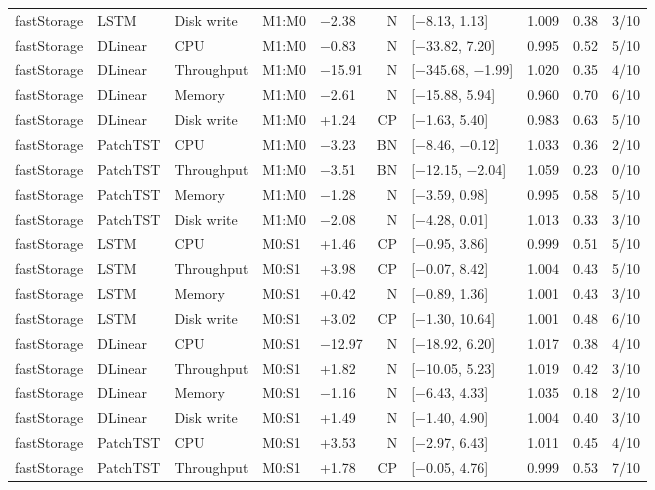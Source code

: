 \documentclass[a4paper,11pt]{article}
\begin{document}
\begin{longtable}{@{}lllllrlrrr@{}}
fastStorage & LSTM & Disk write & M1:M0 & $-$2.38 & N & [$-$8.13, 1.13] & 1.009 & 0.38 & 3/10 \\
fastStorage & DLinear & CPU & M1:M0 & $-$0.83 & N & [$-$33.82, 7.20] & 0.995 & 0.52 & 5/10 \\
fastStorage & DLinear & Throughput & M1:M0 & $-$15.91 & N & [$-$345.68, $-$1.99] & 1.020 & 0.35 & 4/10 \\
fastStorage & DLinear & Memory & M1:M0 & $-$2.61 & N & [$-$15.88, 5.94] & 0.960 & 0.70 & 6/10 \\
fastStorage & DLinear & Disk write & M1:M0 & +1.24 & CP & [$-$1.63, 5.40] & 0.983 & 0.63 & 5/10 \\
fastStorage & PatchTST & CPU & M1:M0 & $-$3.23 & BN & [$-$8.46, $-$0.12] & 1.033 & 0.36 & 2/10 \\
fastStorage & PatchTST & Throughput & M1:M0 & $-$3.51 & BN & [$-$12.15, $-$2.04] & 1.059 & 0.23 & 0/10 \\
fastStorage & PatchTST & Memory & M1:M0 & $-$1.28 & N & [$-$3.59, 0.98] & 0.995 & 0.58 & 5/10 \\
fastStorage & PatchTST & Disk write & M1:M0 & $-$2.08 & N & [$-$4.28, 0.01] & 1.013 & 0.33 & 3/10 \\
fastStorage & LSTM & CPU & M0:S1 & +1.46 & CP & [$-$0.95, 3.86] & 0.999 & 0.51 & 5/10 \\
fastStorage & LSTM & Throughput & M0:S1 & +3.98 & CP & [$-$0.07, 8.42] & 1.004 & 0.43 & 5/10 \\
fastStorage & LSTM & Memory & M0:S1 & +0.42 & N & [$-$0.89, 1.36] & 1.001 & 0.43 & 3/10 \\
fastStorage & LSTM & Disk write & M0:S1 & +3.02 & CP & [$-$1.30, 10.64] & 1.001 & 0.48 & 6/10 \\
fastStorage & DLinear & CPU & M0:S1 & $-$12.97 & N & [$-$18.92, 6.20] & 1.017 & 0.38 & 4/10 \\
fastStorage & DLinear & Throughput & M0:S1 & +1.82 & N & [$-$10.05, 5.23] & 1.019 & 0.42 & 3/10 \\
fastStorage & DLinear & Memory & M0:S1 & $-$1.16 & N & [$-$6.43, 4.33] & 1.035 & 0.18 & 2/10 \\
fastStorage & DLinear & Disk write & M0:S1 & +1.49 & N & [$-$1.40, 4.90] & 1.004 & 0.40 & 3/10 \\
fastStorage & PatchTST & CPU & M0:S1 & +3.53 & N & [$-$2.97, 6.43] & 1.011 & 0.45 & 4/10 \\
fastStorage & PatchTST & Throughput & M0:S1 & +1.78 & CP & [$-$0.05, 4.76] & 0.999 & 0.53 & 7/10 \\

\end{longtable}
\end{document}
